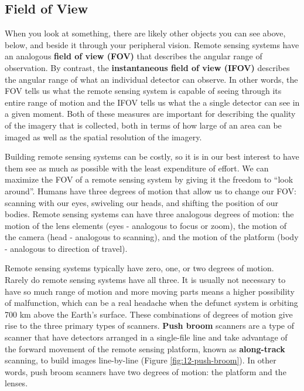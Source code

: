 \documentclass[
]{book}
\begin{document}
\subsection{Field of View}\label{field-of-view}

When you look at something, there are likely other objects you can see above, below, and beside it through your peripheral vision. Remote sensing systems have an analogous \textbf{field of view (FOV)} that describes the angular range of observation. By contrast, the \textbf{instantaneous field of view (IFOV)} describes the angular range of what an individual detector can observe. In other words, the FOV tells us what the remote sensing system is capable of seeing through its entire range of motion and the IFOV tells us what the a single detector can see in a given moment. Both of these measures are important for describing the quality of the imagery that is collected, both in terms of how large of an area can be imaged as well as the spatial resolution of the imagery.

Building remote sensing systems can be costly, so it is in our best interest to have them see as much as possible with the least expenditure of effort. We can maximize the FOV of a remote sensing system by giving it the freedom to ``look around''. Humans have three degrees of motion that allow us to change our FOV: scanning with our eyes, swiveling our heads, and shifting the position of our bodies. Remote sensing systems can have three analogous degrees of motion: the motion of the lens elements (eyes - analogous to focus or zoom), the motion of the camera (head - analogous to scanning), and the motion of the platform (body - analogous to direction of travel).

Remote sensing systems typically have zero, one, or two degrees of motion. Rarely do remote sensing systems have all three. It is usually not necessary to have so much range of motion and more moving parts means a higher possibility of malfunction, which can be a real headache when the defunct system is orbiting 700 km above the Earth's surface. These combinations of degrees of motion give rise to the three primary types of scanners. \textbf{Push broom} scanners are a type of scanner that have detectors arranged in a single-file line and take advantage of the forward movement of the remote sensing platform, known as \textbf{along-track} scanning, to build images line-by-line (Figure \ref{fig:12-push-broom}). In other words, push broom scanners have two degrees of motion: the platform and the lenses.
\end{document}
